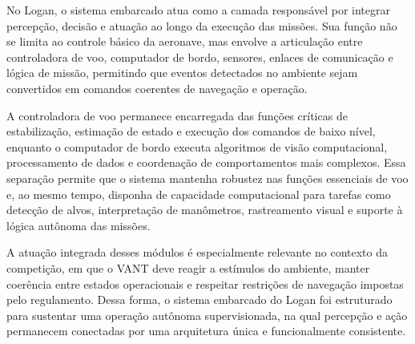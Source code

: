 No Logan, o sistema embarcado atua como a camada responsável por integrar percepção, decisão e atuação ao longo da execução das missões. Sua função não se limita ao controle básico da aeronave, mas envolve a articulação entre controladora de voo, computador de bordo, sensores, enlaces de comunicação e lógica de missão, permitindo que eventos detectados no ambiente sejam convertidos em comandos coerentes de navegação e operação.

A controladora de voo permanece encarregada das funções críticas de estabilização, estimação de estado e execução dos comandos de baixo nível, enquanto o computador de bordo executa algoritmos de visão computacional, processamento de dados e coordenação de comportamentos mais complexos. Essa separação permite que o sistema mantenha robustez nas funções essenciais de voo e, ao mesmo tempo, disponha de capacidade computacional para tarefas como detecção de alvos, interpretação de manômetros, rastreamento visual e suporte à lógica autônoma das missões.

A atuação integrada desses módulos é especialmente relevante no contexto da competição, em que o VANT deve reagir a estímulos do ambiente, manter coerência entre estados operacionais e respeitar restrições de navegação impostas pelo regulamento. Dessa forma, o sistema embarcado do Logan foi estruturado para sustentar uma operação autônoma supervisionada, na qual percepção e ação permanecem conectadas por uma arquitetura única e funcionalmente consistente.
